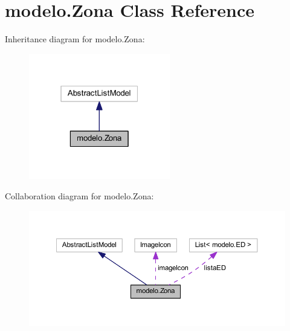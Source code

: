 \hypertarget{classmodelo_1_1_zona}{}\section{modelo.\+Zona Class Reference}
\label{classmodelo_1_1_zona}


Inheritance diagram for modelo.\+Zona\+:
\nopagebreak
\begin{figure}[H]
\begin{center}
\leavevmode
\includegraphics[width=175pt]{classmodelo_1_1_zona__inherit__graph}
\end{center}
\end{figure}


Collaboration diagram for modelo.\+Zona\+:
\nopagebreak
\begin{figure}[H]
\begin{center}
\leavevmode
\includegraphics[width=350pt]{classmodelo_1_1_zona__coll__graph}
\end{center}
\end{figure}
